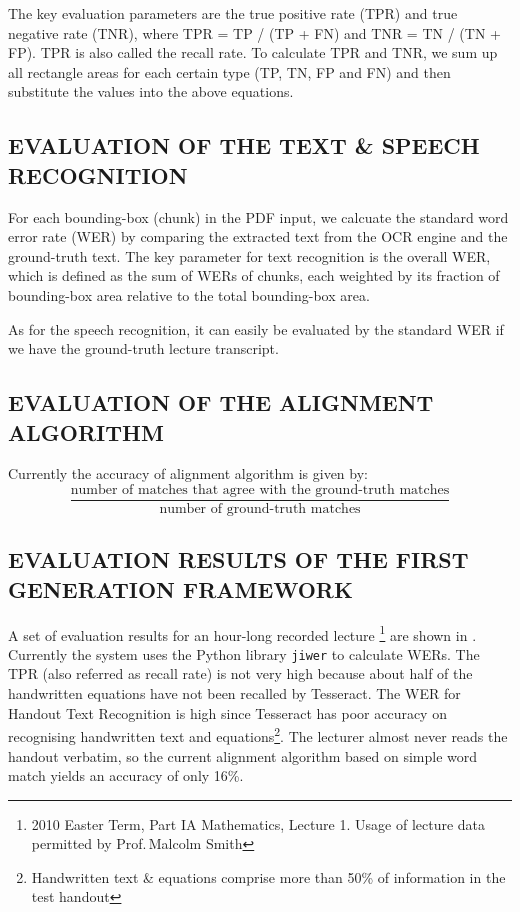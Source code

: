 \documentclass[12pt]{article}
\begin{document}
\begin{appendices}
The key evaluation parameters are the true positive rate (TPR) and true negative rate (TNR), where TPR = TP / (TP + FN) and TNR = TN / (TN + FP). TPR is also called the recall rate. To calculate TPR and TNR, we sum up all rectangle areas for each certain type (TP, TN, FP and FN) and then substitute the values into the above equations.

\subsection{EVALUATION OF THE TEXT \& SPEECH RECOGNITION}

For each bounding-box (chunk) in the PDF input, we calcuate the standard word error rate (WER) by comparing the extracted text from the OCR engine and the ground-truth text. The key parameter for text recognition is the overall WER, which is defined as the sum of WERs of chunks, each weighted by its fraction of bounding-box area relative to the total bounding-box area.

As for the speech recognition, it can easily be evaluated by the standard WER if we have the ground-truth lecture transcript.

\subsection{EVALUATION OF THE ALIGNMENT ALGORITHM}

Currently the accuracy of alignment algorithm is given by:
$$ \frac{\text{number of matches that agree with the ground-truth matches}}{\text{number of ground-truth matches}} $$

\subsection{EVALUATION RESULTS OF THE FIRST GENERATION FRAMEWORK}

A set of evaluation results for an hour-long recorded lecture \footnote{2010 Easter Term, Part IA Mathematics, Lecture 1. Usage of lecture data permitted by Prof.\,Malcolm Smith} are shown in . Currently the system uses the Python library \texttt{jiwer} to calculate WERs. The TPR (also referred as recall rate) is not very high because about half of the handwritten equations have not been recalled by Tesseract. The WER for Handout Text Recognition is high since Tesseract has poor accuracy on recognising handwritten text and equations\footnote{Handwritten text \& equations comprise more than 50\% of information in the test handout}. The lecturer almost never reads the handout verbatim, so the current alignment algorithm based on simple word match yields an accuracy of only 16\%.


\end{appendices}
\end{document}
